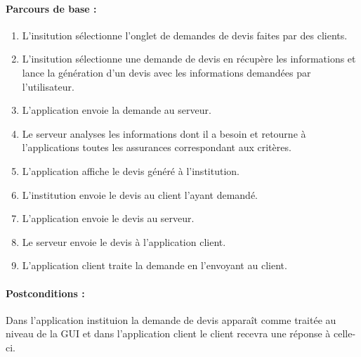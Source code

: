 \documentclass[../annexe.tex]{subfiles}
\begin{document}
		\paragraph{Parcours de base :}
		\begin{enumerate}
				\item L'insitution sélectionne l'onglet de demandes de devis faites par des clients.
				\item L'insitution sélectionne une demande de devis en récupère les informations et lance la génération d'un devis avec les informations demandées par l'utilisateur.
				\item L'application envoie la demande au serveur.
				\item Le serveur analyses les informations dont il a besoin et retourne à l'applications toutes les assurances correspondant aux critères.
				\item L'application affiche le devis généré à l'institution.
				\item L'institution envoie le devis au client l'ayant demandé.
				\item L'application envoie le devis au serveur.
				\item Le serveur envoie le devis à l'application client.
				\item L'application client traite la demande en l'envoyant au client.
		\end{enumerate}
		\paragraph{Postconditions :}
		Dans l'application instituion la demande de devis apparaît comme traitée au niveau de la GUI et dans l'application client le client recevra une réponse à celle-ci.
\end{document}
